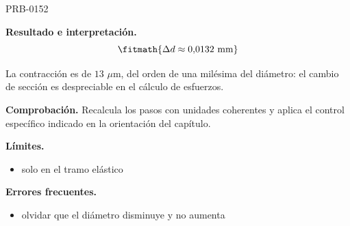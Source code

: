 \begin{studiumworked}{PRB-0152}
\begin{enumerate}
\end{enumerate}

\textbf{Resultado e interpretación.}\[\fitmath{\Delta d \approx 0{,}0132\ \mathrm{mm}}\]

La contracción es de $13$ $\mu$m, del orden de una milésima del diámetro: el cambio de sección es despreciable en el cálculo de esfuerzos.

\par\textbf{Comprobación.} Recalcula los pasos con unidades coherentes y aplica el control específico indicado en la orientación del capítulo.

\textbf{Límites.}\begin{itemize}\item solo en el tramo elástico\end{itemize}

\textbf{Errores frecuentes.}\begin{itemize}\item olvidar que el diámetro disminuye y no aumenta\end{itemize}

\end{studiumworked}

\Needspace{.3\textheight}

